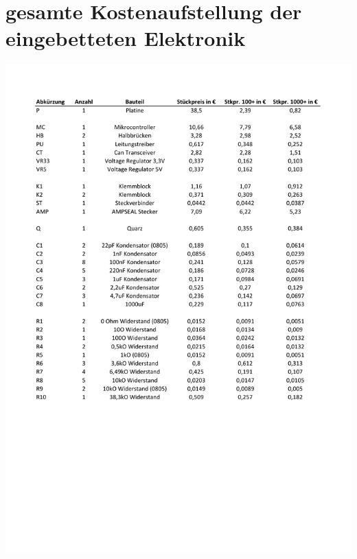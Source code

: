 \section{gesamte Kostenaufstellung der eingebetteten Elektronik}
\begin{center}
	\includegraphics[page=1,width=\columnwidth]{./datenblaetter/Gesamtkosten}
\end{center}
